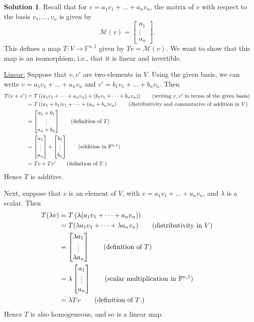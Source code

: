 \documentclass[12pt]{article}
\theoremstyle{definition}
\theoremstyle{definition}
\newtheorem*{soln}{Solution}
\newcommand{\F}{\mathbb{F}}
\begin{document}
\begin{soln}
Recall that for $v=a_1v_1+\dots+a_nv_n$, the matrix of $v$ with respect to the basis $v_1,\dots,v_n$ is given by
\[\mathcal{M}(v)=\begin{bmatrix} a_1 \\ \vdots \\ a_n \end{bmatrix}.\]
This defines a map $T:V\to\F^{n,1}$ given by $Tv=\mathcal{M}(v)$. We want to show that this map is an isomorphism, i.e., that it is linear and invertible.

\underline{Linear:}
Suppose that $v,v'$ are two elements in $V$. Using the given basis, we can write $v=a_1v_1+\dots+a_nv_n$ and $v'=b_1v_1+\dots+b_nv_n$. Then
\begin{align*}
T(v+v') &= T\left((a_1v_1+\dots+a_nv_n)+(b_1v_1+\dots+b_nv_n)\right) \tag{writing $v,v'$ in terms of the given basis}\\
&= T\left((a_1+b_1)v_1+\dots+(a_n+b_n)v_n\right) \tag{distributivity and commutative of addition in $V$}\\
&= \begin{bmatrix} a_1+b_1 \\ \vdots \\ a_n+b_n \end{bmatrix} \tag{definition of $T$}\\
&= \begin{bmatrix} a_1 \\ \vdots \\ a_n \end{bmatrix}+\begin{bmatrix} b_1 \\ \vdots \\ b_n \end{bmatrix} \tag{addition in $\F^{n,1}$}\\
&= Tv+Tv' \tag{definition of $T$.}
\end{align*}
Hence $T$ is additive.

Next, suppose that $v$ is an element of $V$, with $v=a_1v_1+\dots+a_nv_n$, and $\lambda$ is a scalar. Then
\begin{align*}
T(\lambda v) &= T\left(\lambda(a_1v_1+\dots+a_nv_n)\right)\\
&= T(\lambda a_1v_1+\dots+\lambda a_nv_n) \tag{distributivity in $V$}\\
&= \begin{bmatrix} \lambda a_1 \\ \vdots \\ \lambda a_n \end{bmatrix} \tag{definition of $T$}\\
&= \lambda \begin{bmatrix} a_1 \\ \vdots \\ a_n \end{bmatrix} \tag{scalar multiplication in $\F^{n,1}$}\\
&= \lambda Tv \tag{definition of $T$.}
\end{align*}
Hence $T$ is also homogeneous, and so is a linear map.


\end{soln}
\end{document}
